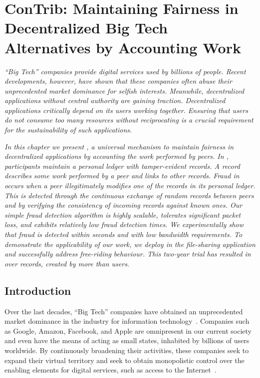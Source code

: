 \chapter{ConTrib: Maintaining Fairness in Decentralized Big Tech Alternatives by Accounting Work}
\label{chapter:trustchain}

\emph{\enquote{Big Tech} companies provide digital services used by billions of people.
Recent developments, however, have shown that these companies often abuse their unprecedented market dominance for selfish interests.
Meanwhile, decentralized applications without central authority are gaining traction.
Decentralized applications critically depend on its users working together.
Ensuring that users do not consume too many resources without reciprocating is a crucial requirement for the sustainability of such applications.}

\emph{In this chapter we present \TrustChain{}, a universal mechanism to maintain fairness in decentralized applications by accounting the work performed by peers.
In \TrustChain{}, participants maintain a personal ledger with tamper-evident records.
A record describes some work performed by a peer and links to other records.
Fraud in \TrustChain{} occurs when a peer illegitimately modifies one of the records in its personal ledger.
This is detected through the continuous exchange of random records between peers and by verifying the consistency of incoming records against known ones.
Our simple fraud detection algorithm is highly scalable, tolerates significant packet loss, and exhibits relatively low fraud detection times.
We experimentally show that fraud is detected within seconds and with low bandwidth requirements.
To demonstrate the applicability of our work, we deploy \TrustChain{} in the \Tribler{} file-sharing application and successfully address free-riding behaviour.
This two-year trial has resulted in over \TrialRecords{} records, created by more than \TrialUsers{} users.}

\newpage

\section{Introduction}

Over the last decades, \enquote{Big Tech} companies have obtained an unprecedented market dominance in the industry for information technology~\cite{frost2019bigtech}.
Companies such as Google, Amazon, Facebook, and Apple are omnipresent in our current society and even have the means of acting as small states, inhabited by billions of users worldwide.
By continuously broadening their activities, these companies seek to expand their virtual territory and seek to obtain monopolistic control over the enabling elements for digital services, such as access to the Internet~\cite{best2014internet}.


